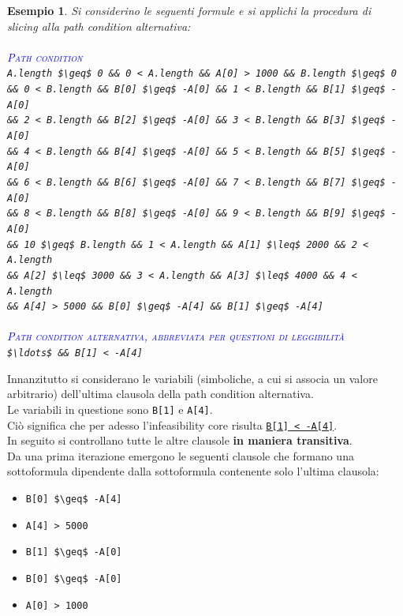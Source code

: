 \documentclass[a4paper, 12pt, oneside]{book}
\newcommand{\coloredtextsc}[2]{\textcolor{#1}{\textsc{#2}}}
\theoremstyle{normal}
\newtheorem{esempio}{Esempio}
\begin{document}
\begin{esempio}
\textit{Si considerino le seguenti formule e si applichi la procedura di slicing alla path condition alternativa:} \\ \\
\coloredtextsc{blue}{Path condition} \\
\lstinline|A.length $\geq$ 0 && 0 < A.length && A[0] > 1000 && B.length $\geq$ 0| \\
\lstinline|&& 0 < B.length && B[0] $\geq$ -A[0] && 1 < B.length && B[1] $\geq$ -A[0]| \\
\lstinline|&& 2 < B.length && B[2] $\geq$ -A[0] && 3 < B.length && B[3] $\geq$ -A[0]| \\
\lstinline|&& 4 < B.length && B[4] $\geq$ -A[0] && 5 < B.length && B[5] $\geq$ -A[0]| \\ \lstinline|&& 6 < B.length && B[6] $\geq$ -A[0] && 7 < B.length && B[7] $\geq$ -A[0]| \\ \lstinline|&& 8 < B.length && B[8] $\geq$ -A[0] && 9 < B.length && B[9] $\geq$ -A[0]| \\ \lstinline|&& 10 $\geq$ B.length && 1 < A.length && A[1] $\leq$ 2000 && 2 < A.length| \\ \lstinline|&& A[2] $\leq$ 3000 && 3 < A.length && A[3] $\leq$ 4000 && 4 < A.length| \\ \lstinline|&& A[4] > 5000 && B[0] $\geq$ -A[4] && B[1] $\geq$ -A[4]| \\ \\
\coloredtextsc{blue}{Path condition alternativa, abbreviata per questioni di leggibilità} \\
\lstinline|$\ldots$ && B[1] < -A[4]|
\end{esempio}
\clearpage \noindent Innanzitutto si considerano le variabili (simboliche, a cui si associa un valore arbitrario) dell'ultima clausola della path condition alternativa. \\ 
Le variabili in questione sono \verb|B[1]| e \verb|A[4]|. \\ Ciò significa che per adesso l'infeasibility core risulta \underline{\lstinline|B[1] < -A[4]|}. \\ In seguito si controllano tutte le altre clausole \textbf{in maniera transitiva}. \\ Da una prima iterazione emergono le seguenti clausole che formano una sottoformula dipendente dalla sottoformula contenente solo l'ultima clausola:
\begin{itemize}[itemsep=0pt, topsep=2pt]
    \item \lstinline|B[0] $\geq$ -A[4]|
    \item \lstinline|A[4] > 5000|
    \item \lstinline|B[1] $\geq$ -A[0]|
    \item \lstinline|B[0] $\geq$ -A[0]|
    \item \lstinline|A[0] > 1000|
\end{itemize}
\end{document}
